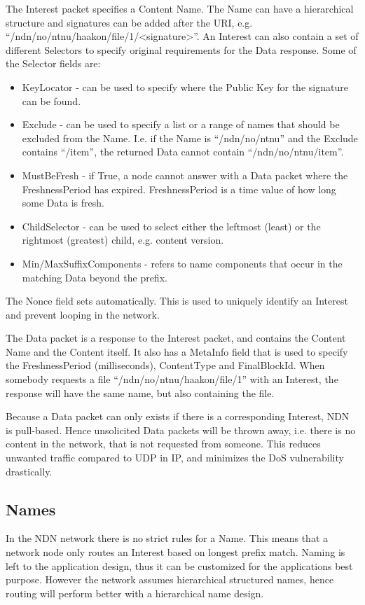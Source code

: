 The Interest packet specifies a Content Name. 
The Name can have a hierarchical structure and signatures can be added after the \gls{URI}, e.g. ``/ndn/no/ntnu/haakon/file/1/<signature>''.
An Interest can also contain a set of different Selectors to specify original requirements for the Data response. 
Some of the Selector fields are:
\begin{itemize}
  \item KeyLocator - can be used to specify where the Public Key for the signature can be found.
  \item Exclude - can be used to specify a list or a range of names that should be excluded from the Name. 
  I.e. if the Name is ``/ndn/no/ntnu'' and the Exclude contains ``/item'', the returned Data cannot contain ``/ndn/no/ntnu/item''.
  \item MustBeFresh - if True, a node cannot answer with a Data packet where the FreshnessPeriod has expired.
  FreshnessPeriod is a time value of how long some Data is fresh.
  \item ChildSelector - can be used to select either the leftmost (least) or the rightmost (greatest) child, e.g. content version. 
  \item Min/MaxSuffixComponents - refers to name components that occur in the matching Data beyond the prefix. 
\end{itemize}
The Nonce field sets automatically. 
This is used to uniquely identify an Interest and prevent looping in the network.

The Data packet is a response to the Interest packet, and contains the Content Name and the Content itself.
It also has a MetaInfo field that is used to specify the FreshnessPeriod (milliseconds), ContentType and FinalBlockId. 
When somebody requests a file ``/ndn/no/ntnu/haakon/file/1'' with an Interest, the response will have the same name, but also containing the file.

Because a Data packet can only exists if there is a corresponding Interest, \gls{NDN} is pull-based.
Hence unsolicited Data packets will be thrown away, i.e. there is no content in the network, that is not requested from someone.
This reduces unwanted traffic compared to \gls{UDP} in \gls{IP}, and minimizes the \gls{DoS} vulnerability drastically.

\subsection{Names}\label{name}
In the \gls{NDN} network there is no strict rules for a Name.
This means that a network node only routes an Interest based on longest prefix match.
Naming is left to the application design, thus it can be customized for the applications best purpose.
However the network assumes hierarchical structured names, hence routing will perform better with a hierarchical name design.

